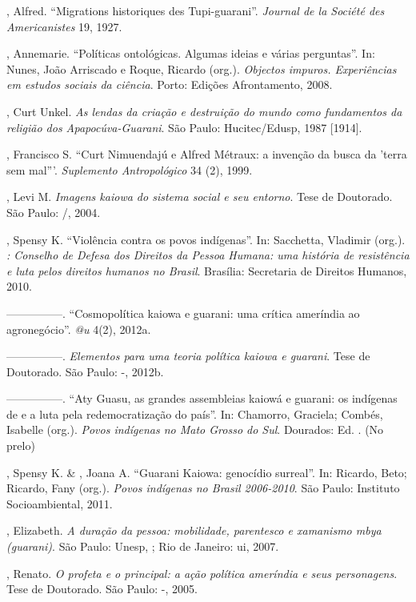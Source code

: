 \begin{Parskip}
, Alfred. ``Migrations historiques des Tupi-guarani''. \emph{Journal
de la Société des Americanistes} 19, 1927.

, Annemarie. ``Políticas ontológicas. Algumas ideias e várias
perguntas''. In: Nunes, João Arriscado e Roque, Ricardo (org.). \emph{Objectos
impuros. Experiências em estudos sociais da ciência}. Porto: Edições
Afrontamento, 2008.

, Curt Unkel. \emph{As lendas da criação e destruição do mundo
como fundamentos da religião dos Apapocúva-Guarani}. São Paulo:
Hucitec/Edusp, 1987 [1914].

, Francisco S. ``Curt Nimuendajú e Alfred Métraux: a invenção
da busca da 'terra sem mal'''. \emph{Suplemento Antropológico} 34 (2), 1999. 

, Levi M. \emph{Imagens kaiowa do sistema social e seu entorno}.
Tese de Doutorado. São Paulo: /, 2004.

, Spensy K. ``Violência contra os povos indígenas''. In:
Sacchetta, Vladimir (org.). \emph{: Conselho de Defesa dos Direitos da
Pessoa Humana: uma história de resistência e luta pelos direitos
humanos no Brasil}. Brasília: Secretaria de Direitos Humanos, 2010.

—————. ``Cosmopolítica kaiowa e guarani: uma crítica ameríndia ao
agronegócio''. \emph{@u} 4(2), 2012a.

—————. \emph{Elementos para uma teoria política kaiowa e guarani}. Tese
de Doutorado. São Paulo: -, 2012b. 

—————. ``Aty Guasu, as grandes assembleias kaiowá e guarani: os
indígenas de  e a luta pela redemocratização do país''. In: Chamorro,
Graciela; Combés, Isabelle (org.). \emph{Povos indígenas no Mato Grosso do
Sul}. Dourados: Ed. . (No prelo)

, Spensy K. \& , Joana A. ``Guarani Kaiowa: genocídio
surreal''. In: Ricardo, Beto; Ricardo, Fany (org.). \emph{Povos indígenas no
Brasil 2006-2010}. São Paulo: Instituto Socioambiental, 2011.

, Elizabeth. \emph{A duração da pessoa: mobilidade, parentesco
e xamanismo mbya (guarani)}. São Paulo: Unesp, ; Rio de Janeiro:
ui, 2007.

, Renato. \emph{O profeta e o principal: a ação política
ameríndia e seus personagens}. Tese de Doutorado. São Paulo: -,
2005.


\end{Parskip}
